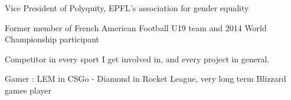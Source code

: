 


\begin{cventries}


\cventry
{} %
{}
{}
{}
{ %
\begin{cvitems}
\item {Vice President of Polyquity, EPFL's association for gender equality}
\item {Former member of French American Football U19 team and 2014 World Championship participant}
\item {Competitor in every sport I get involved in, and every project in general.}
\item {Gamer : LEM in CSGo - Diamond in Rocket League, very long term Blizzard games player}
\end{cvitems}
}




\end{cventries}